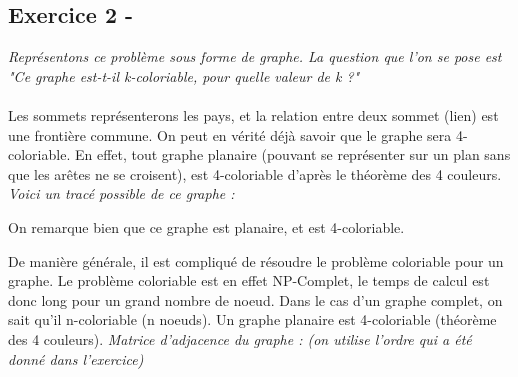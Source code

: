 \documentclass{article}
\begin{document}
\subsection*{Exercice 2 -}
\textit{Représentons ce problème sous forme de graphe. La question que l'on se pose est "Ce graphe est-t-il k-coloriable, pour quelle valeur de k ?"}\\\\
\linebreak
\textsf{Les sommets représenterons les pays, et la relation entre deux sommet (lien) est une frontière commune.}
\textsf{On peut en vérité déjà savoir que le graphe sera 4-coloriable. En effet, tout graphe planaire (pouvant se représenter sur un plan sans que les arêtes ne se croisent), est 4-coloriable d'après le théorème des 4 couleurs.}\\
\linebreak
\textit{Voici un tracé possible de ce graphe :}
	\begin{center}
		\textsf{On remarque bien que ce graphe est planaire, et est 4-coloriable.}
	\end{center}
\textsf{De manière générale, il est compliqué de résoudre le problème coloriable pour un graphe.}
\textsf{Le problème coloriable est en effet NP-Complet, le temps de calcul est donc long pour un grand nombre de noeud.}
\textsf{Dans le cas d'un graphe complet, on sait qu'il n-coloriable (n noeuds).}
\textsf{Un graphe planaire est 4-coloriable (théorème des 4 couleurs).}
\textit{Matrice d'adjacence du graphe : (on utilise l'ordre qui a été donné dans l'exercice)}
\end{document}
